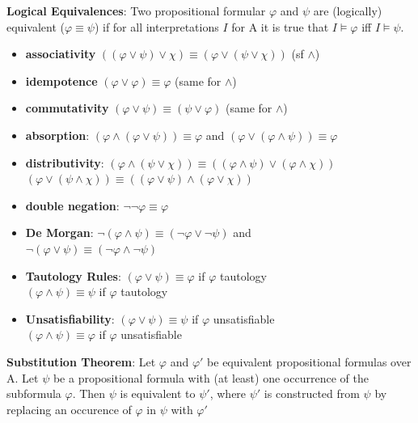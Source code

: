 \vfill\null
\columnbreak 
\textbf{Logical Equivalences}: Two propositional formular $\varphi$ and $\psi$ are (logically) equivalent ($\varphi \equiv \psi$) if for all interpretations $I$ for A it is true that $I \vDash \varphi$ iff $I \vDash \psi$. 
\begin{itemize}[noitemsep,topsep=0pt,leftmargin=*]
    \item \textbf{associativity} $((\varphi \vee \psi) \vee \chi) \equiv (\varphi \vee (\psi \vee \chi))$ (sf $\wedge$)
    \item \textbf{idempotence} $(\varphi \vee \varphi) \equiv \varphi$ (same for $\wedge$)
    \item \textbf{commutativity} $(\varphi \vee \psi) \equiv (\psi \vee \varphi)$ (same for $\wedge$)
    \item \textbf{absorption}: $(\varphi \wedge (\varphi \vee \psi)) \equiv \varphi$ and $(\varphi \vee (\varphi \wedge \psi)) \equiv \varphi$
    \item \textbf{distributivity}: $(\varphi \wedge (\psi \vee \chi)) \equiv ((\varphi \wedge \psi) \vee (\varphi \wedge \chi))$ \\ \makebox[48pt]{}$(\varphi \vee (\psi \wedge \chi)) \equiv ((\varphi \vee \psi) \wedge (\varphi \vee \chi))$ \\
    \item \textbf{double negation}: $\neg \neg \varphi \equiv \varphi$
    \item \textbf{De Morgan}: $\neg (\varphi \wedge \psi) \equiv (\neg\varphi \vee \neg\psi)$ and \\ 
    \makebox[38pt]{} $\neg (\varphi \vee \psi) \equiv (\neg\varphi \wedge \neg\psi)$ 
    \item \textbf{Tautology Rules}: $(\varphi \vee \psi) \equiv \varphi$ if $\varphi$ tautology \\
    \makebox[54pt]{} $(\varphi \wedge \psi) \equiv \psi$ if $\varphi$ tautology
    \item \textbf{Unsatisfiability}: $(\varphi \vee \psi) \equiv \psi$ if $\varphi$ unsatisfiable \\
    \makebox[53pt]{} $(\varphi \wedge \psi) \equiv \varphi$ if $\varphi$ unsatisfiable
\end{itemize}
\fontsize{6pt}{5pt}\selectfont
\textbf{Substitution Theorem}: Let $\varphi$ and $\varphi'$ be equivalent propositional formulas over A. Let $\psi$ be a propositional formula with (at least) one occurrence of the subformula $\varphi$. Then $\psi$ is equivalent to $\psi'$, where $\psi'$ is constructed from $\psi$ by replacing an occurence of $\varphi$ in $\psi$ with $\varphi'$ \\ %
\fontsize{7pt}{5pt}\selectfont